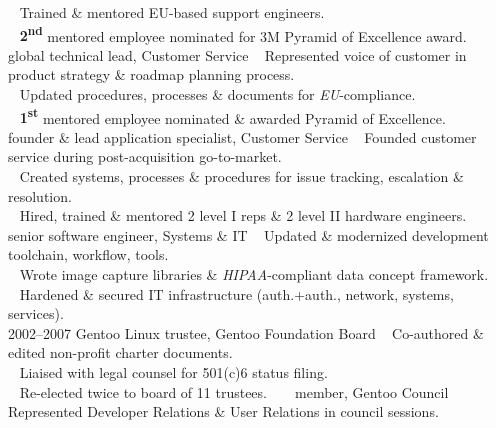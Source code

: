 \documentclass[]{friggeri-cv} %
\begin{document}
\begin{entrylist}
{{\tiny {}} ~ Trained \& mentored EU-based support engineers.\\
{\tiny {}} ~ \textbf{2\textsuperscript{nd}} mentored employee nominated for 3M Pyramid of Excellence award.}
\entry
{~}
{~}
{global technical lead, Customer Service}
{{\tiny {}} ~ Represented voice of customer  in product strategy \& roadmap planning process.\\
{\tiny {}} ~ Updated procedures, processes \& documents for \emph{EU}-compliance.\\
{\tiny {}} ~ \textbf{1\textsuperscript{st}} mentored employee nominated \& awarded Pyramid of Excellence.}
\entry
{~}
{~}
{founder \& lead application specialist, Customer Service}
{{\tiny {}} ~ Founded customer service during post-acquisition go-to-market.\\
{\tiny {}} ~ Created systems, processes \& procedures for issue tracking, escalation \& resolution.\\
{\tiny {}} ~ Hired, trained \& mentored 2 level I reps \& 2 level II hardware engineers.} 
\entry
{~}
{~}
{senior software engineer, Systems \& IT}
{{\tiny {}} ~ Updated \& modernized development toolchain, workflow, tools.\\
{\tiny {}} ~ Wrote image capture libraries \& \emph{HIPAA}-compliant data concept framework.\\
{\tiny {}} ~ Hardened \& secured IT infrastructure (auth.+auth., network, systems, services).\\}
\entry
{2002--2007}
{Gentoo Linux}
{trustee, Gentoo Foundation Board}
{{\tiny {}} ~ Co-authored \& edited non-profit charter documents.\\
{\tiny {}} ~ Liaised with legal counsel for 501(c)6 status filing.\\
{\tiny {}} ~ Re-elected twice to board of 11 trustees.}
\entry
{~}
{~}
{member, Gentoo Council}
{{\tiny {}} ~ Represented Developer Relations \& User Relations in council sessions.\\
}
\end{entrylist}
\end{document}
